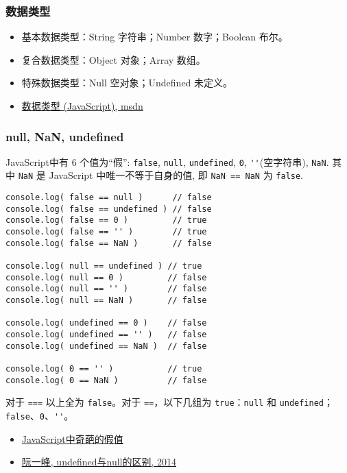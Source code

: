 \subsubsection{数据类型}\label{ux6570ux636eux7c7bux578b}

\begin{itemize}
\item
  基本数据类型：String 字符串；Number 数字；Boolean 布尔。
\item
  复合数据类型：Object 对象；Array 数组。
\item
  特殊数据类型：Null 空对象；Undefined 未定义。
\item
  \href{https://msdn.microsoft.com/zh-cn/library/7wkd9z69(v=vs.94).aspx}{数据类型
  (JavaScript), msdn}
\end{itemize}

\subsubsection{null, NaN, undefined}\label{null-nan-undefined}

JavaScript中有 6 个值为``假'': \lstinline!false!, \lstinline!null!,
\lstinline!undefined!, \lstinline!0!, \lstinline!''!(空字符串),
\lstinline!NaN!. 其中 \lstinline!NaN! 是 JavaScript
中唯一不等于自身的值, 即 \lstinline!NaN == NaN! 为 \lstinline!false!.

\begin{lstlisting}
console.log( false == null )      // false
console.log( false == undefined ) // false
console.log( false == 0 )         // true
console.log( false == '' )        // true
console.log( false == NaN )       // false

console.log( null == undefined ) // true
console.log( null == 0 )         // false
console.log( null == '' )        // false
console.log( null == NaN )       // false

console.log( undefined == 0 )    // false
console.log( undefined == '' )   // false
console.log( undefined == NaN )  // false

console.log( 0 == '' )           // true
console.log( 0 == NaN )          // false
\end{lstlisting}

对于 \lstinline!===! 以上全为 \lstinline!false!。对于
\lstinline!==!，以下几组为 \lstinline!true!：\lstinline!null! 和
\lstinline!undefined!；\lstinline!false!、\lstinline!0!、\lstinline!''!。

\begin{itemize}
\tightlist
\item
  \href{http://www.cnblogs.com/snandy/p/3589517.html}{JavaScript中奇葩的假值}
\item
  \href{http://www.ruanyifeng.com/blog/2014/03/undefined-vs-null.html}{阮一峰,
  undefined与null的区别, 2014}
\end{itemize}

